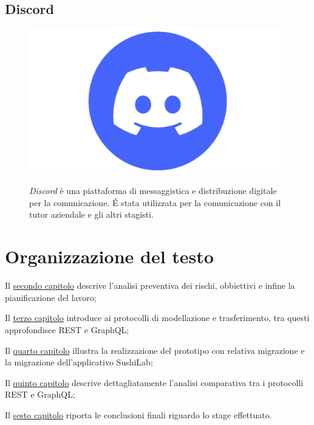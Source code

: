 \subsection*{Discord}
\FloatBarrier
\begin{figure}[!h]
  \begin{minipage}[h]{0.3\linewidth}
    \centering
    \includegraphics[width=0.7\linewidth]{immagini/discord.png}
  \end{minipage}
  \begin{minipage}[!h]{0.7\linewidth}
    \textit{Discord} è una piattaforma di messaggistica e distribuzione digitale per la comunicazione. É stata utilizzata per la comunicazione con il tutor aziendale e gli altri stagisti.
  \end{minipage}
\end{figure}
\FloatBarrier
\newpage
\section{Organizzazione del testo}
\begin{description}
    \item Il {\hyperref[descrizione-stage]{secondo capitolo}} descrive l'analisi preventiva dei rischi, obbiettivi e infine la pianificazione del lavoro;

    \item Il {\hyperref[protocolli-trasmissione-dati]{terzo capitolo}} introduce ai protocolli di modellazione e trasferimento, tra questi approfondisce REST e GraphQL;

    \item Il {\hyperref[casi-uso]{quarto capitolo}} illustra la realizzazione del prototipo con relativa migrazione e la migrazione dell'applicativo SushiLab;

    \item Il {\hyperref[analisi-comparativa]{quinto capitolo}} descrive dettagliatamente l'analisi comparativa tra i protocolli REST e GraphQL;

    \item Il {\hyperref[conclusioni]{sesto capitolo}} riporta le conclusioni finali riguardo lo stage effettuato.
\end{description}
